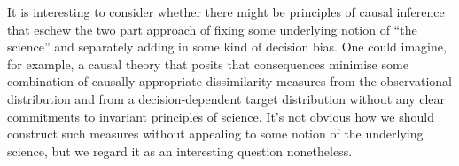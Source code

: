 It is interesting to consider whether there might be principles of causal inference that eschew the two part approach of fixing some underlying notion of ``the science'' and separately adding in some kind of decision bias. One could imagine, for example, a causal theory that posits that consequences minimise some combination of causally appropriate dissimilarity measures from the observational distribution and from a decision-dependent target distribution without any clear commitments to invariant principles of science. It's not obvious how we should construct such measures without appealing to some notion of the underlying science, but we regard it as an interesting question nonetheless.

